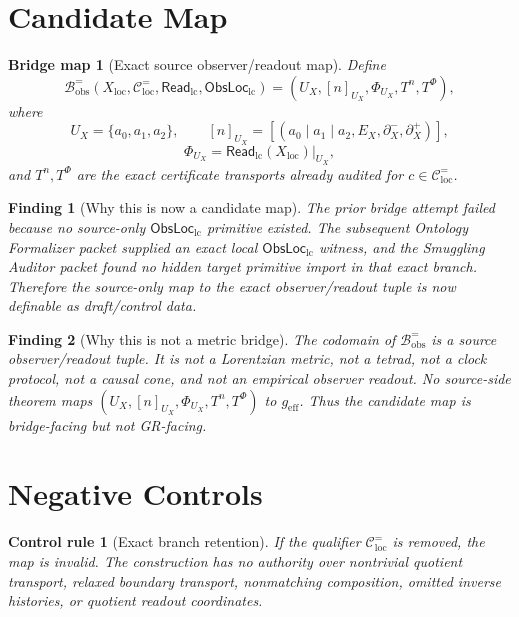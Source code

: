 \documentclass[11pt]{article}
\newcommand{\ReadLC}{\mathsf{Read}_{\mathrm{lc}}}
\newcommand{\ObsLocLC}{\mathsf{ObsLoc}_{\mathrm{lc}}}
\newcommand{\geff}{g_{\mathrm{eff}}}
\newtheorem{bridge}{Bridge map}
\newtheorem{finding}{Finding}
\newtheorem{controlrule}{Control rule}
\begin{document}
\section{Candidate Map}

\begin{bridge}[Exact source observer/readout map]
Define
\[
    \mathcal{B}^{=}_{\mathrm{obs}}
    (X_{\mathrm{loc}},\mathcal{C}^{=}_{\mathrm{loc}},\ReadLC,\ObsLocLC)
    =
    (U_X,[n]_{U_X},\Phi_{U_X},T^n,T^\Phi),
\]
where
\[
    U_X=\{a_0,a_1,a_2\},
    \qquad
    [n]_{U_X}=[(a_0\mid a_1\mid a_2,E_X,\partial^-_X,\partial^+_X)],
\]
\[
    \Phi_{U_X}
    =
    \ReadLC(X_{\mathrm{loc}})|_{U_X},
\]
and \(T^n,T^\Phi\) are the exact certificate transports already
audited for \(c\in\mathcal{C}^{=}_{\mathrm{loc}}\).
\end{bridge}

\begin{finding}[Why this is now a candidate map]
The prior bridge attempt failed because no source-only
\(\ObsLocLC\) primitive existed. The subsequent Ontology Formalizer
packet supplied an exact local \(\ObsLocLC\) witness, and the
Smuggling Auditor packet found no hidden target primitive import in
that exact branch. Therefore the source-only map to the exact
observer/readout tuple is now definable as draft/control data.
\end{finding}

\begin{finding}[Why this is not a metric bridge]
The codomain of \(\mathcal{B}^{=}_{\mathrm{obs}}\) is a source
observer/readout tuple. It is not a Lorentzian metric, not a tetrad,
not a clock protocol, not a causal cone, and not an empirical
observer readout. No source-side theorem maps
\((U_X,[n]_{U_X},\Phi_{U_X},T^n,T^\Phi)\) to \(\geff\). Thus the
candidate map is bridge-facing but not GR-facing.
\end{finding}

\section{Negative Controls}

\begin{controlrule}[Exact branch retention]
If the qualifier \(\mathcal{C}^{=}_{\mathrm{loc}}\) is removed, the
map is invalid. The construction has no authority over nontrivial
quotient transport, relaxed boundary transport, nonmatching
composition, omitted inverse histories, or quotient readout
coordinates.
\end{controlrule}
\end{document}
